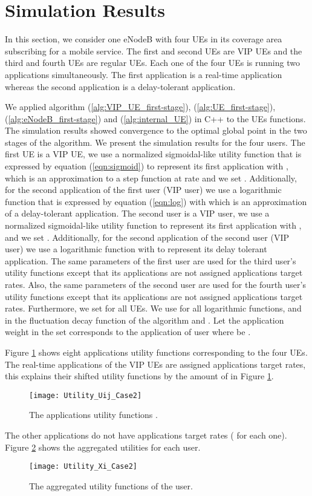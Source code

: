 \documentclass[journal]{IEEEtran} 				\IEEEoverridecommandlockouts 						\usepackage{amsmath,amssymb}
\begin{document}
\section{Simulation Results}\label{sec:sim}
In this section, we consider one eNodeB with four UEs in its coverage area subscribing for a mobile service. The first and second UEs are VIP UEs and the third and fourth UEs are regular UEs. Each one of the four UEs is running two applications simultaneously. The first application is a real-time application whereas the second application is a delay-tolerant application.

We applied algorithm (\ref{alg:VIP_UE_first-stage}), (\ref{alg:UE_first-stage}), (\ref{alg:eNodeB_first-stage}) and (\ref{alg:internal_UE}) in C++ to the UEs functions. The simulation results showed convergence to the optimal global point in the two stages of the algorithm. We present the simulation results for the four users. The first UE is a VIP UE, we use a normalized sigmoidal-like utility function that is expressed by equation (\ref{eqn:sigmoid}) to represent its first application with ,  which is an approximation to a step function at rate  and we set . Additionally, for the second application of the first user (VIP user) we use a logarithmic function that is expressed by equation (\ref{eqn:log}) with  which is an approximation of a delay-tolerant application. The second user is a VIP user, we use a normalized sigmoidal-like utility function to represent its first application with ,  and we set . Additionally, for the second application of the second user (VIP user) we use a logarithmic function with  to represent its delay tolerant application. The same parameters of the first user are used for the third user's utility functions except that its applications are not assigned applications target rates. Also, the same parameters of the second user are used for the fourth user's utility functions except that its applications are not assigned applications target rates. Furthermore, we set  for all UEs. We use  for all logarithmic functions,  and  in the fluctuation decay function of the algorithm and . Let the application weight  in the set  corresponds to the  application of user  where  be  .

Figure \ref{fig:Utility_Uij_Case2} shows eight applications utility functions corresponding to the four UEs. The real-time applications of the VIP UEs are assigned applications target rates, this explains their shifted utility functions by the amount of  in Figure \ref{fig:Utility_Uij_Case2}.
\begin{figure}
\centering
\texttt{[image: Utility\_Uij\_Case2]}
\caption{The applications utility functions .}
\label{fig:Utility_Uij_Case2}
\end{figure}
The other applications do not have applications target rates ( for each one). Figure \ref{fig:Utility_Xi_Case2} shows the aggregated utilities  for each user.
\begin{figure}
\centering
\texttt{[image: Utility\_Xi\_Case2]}
\caption{The aggregated utility functions  of the  user.}
\label{fig:Utility_Xi_Case2}
\end{figure}
\end{document}
